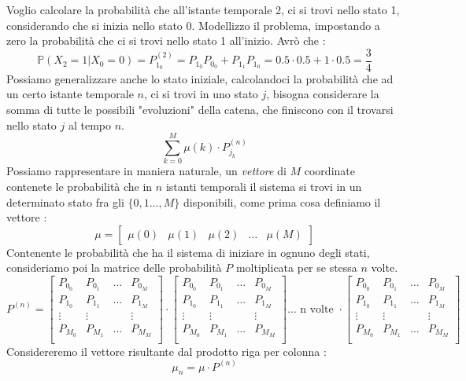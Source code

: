 \documentclass[12pt, letterpaper]{article}
\newcommand{\Prob}{{\mathbb P}}
\begin{document}
Voglio calcolare la probabilità che all'istante temporale 2, ci si trovi nello stato 1, considerando che si inizia 
nello stato 0. Modellizzo il problema, impostando a zero la probabilità che ci si trovi nello stato 1 all'inizio. 
Avrò che : 
$$\Prob(X_2=1|X_0=0)=P^{(2)}_{1_0}=P_{1_0}P_{0_0}+P_{1_1}P_{1_0}=0.5\cdot 0.5+1\cdot 0.5 = \dfrac{3}{4}$$
Possiamo generalizzare anche lo stato iniziale, calcolandoci la probabilità che ad un certo istante 
temporale \(n\), ci si trovi in uno stato \(j\), bisogna considerare la somma di tutte le possibili 
"evoluzioni" della catena, che finiscono con il trovarsi nello stato \(j\) al tempo \(n\).
$$\sum_{k=0}^M \mu(k)\cdot P^{(n)}_{j_k}$$
Possiamo rappresentare in maniera naturale, un \textit{vettore} di \(M\) coordinate contenete 
le probabilità che in \(n\) istanti temporali il sistema si trovi in un determinato stato 
fra gli \(\{0,1\dots,M\}\) disponibili, 
come prima cosa definiamo il vettore : $$\mu=\begin{bmatrix}
    \mu(0)&\mu(1)&\mu(2)&\dots&\mu(M)
\end{bmatrix}$$
Contenente le probabilità che ha il sistema di iniziare in ognuno degli stati, consideriamo poi la matrice 
delle probabilità \(P\) moltiplicata per se stessa \(n\) volte.
$$P^{(n)}=
\begin{bmatrix}
    P_{0_0}& P_{0_1}&\dots&P_{0_M}\\
    P_{1_0}& P_{1_1}&\dots&P_{1_M}\\
    \vdots &\vdots &&\vdots \\
    P_{M_0}& P_{M_1}&\dots&P_{M_M}\\
\end{bmatrix}\cdot 
\begin{bmatrix}
    P_{0_0}& P_{0_1}&\dots&P_{0_M}\\
    P_{1_0}& P_{1_1}&\dots&P_{1_M}\\
    \vdots &\vdots &&\vdots \\
    P_{M_0}& P_{M_1}&\dots&P_{M_M}\\
\end{bmatrix}\dots \text{ n volte }\cdot \begin{bmatrix}
    P_{0_0}& P_{0_1}&\dots&P_{0_M}\\
    P_{1_0}& P_{1_1}&\dots&P_{1_M}\\
    \vdots &\vdots &&\vdots \\
    P_{M_0}& P_{M_1}&\dots&P_{M_M}\\
\end{bmatrix} 
$$
Considereremo il vettore risultante dal prodotto riga per colonna : $$\mu_n = \mu \cdot P^{(n)}$$
\end{document}
